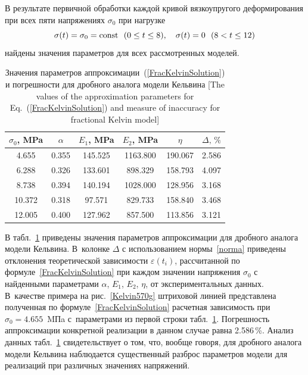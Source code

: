 В результате первичной обработки каждой кривой вязкоупругого деформирования при всех пяти напряжениях $\sigma_{0}$
при нагрузке
 $$\sigma(t)=\sigma_{0}={\rm const}~~ (0\leq t \leq 8),\quad \sigma(t)=0~~ (8<t\leq 12)$$ 
 найдены значения параметров для всех рассмотренных моделей.
 
\begin{table}[b!]

\small \centering

\caption{Значения параметров аппроксимации~(\ref{FracKelvinSolution}) и погрешности для дробного аналога модели Кельвина [The values of the approximation parameters for Eq.~(\ref{FracKelvinSolution}) and measure of inaccuracy for fractional Kelvin model] \label{un:tabl1}}
\vspace{-3mm}
\renewcommand{\tabcolsep}{0.55cm}
\begin{tabular}{c||c|c|c|c|c}
\hline
\rule{0mm}{11pt}%
\footnotesize $\sigma_{0}$, MPa & \footnotesize  $\alpha$ & \footnotesize  $E_{1}$, MPa & \footnotesize  $E_{2}$, MPa & \footnotesize  $\eta$ & \footnotesize  $\Delta,\, \%$ \\
            \hline
            \rule{0mm}{12pt}%
            \phantom{1}4.655 & 0.355 & 145.525 & 1163.800 & 190.067 & 2.586 \\
             \phantom{1}6.288 & 0.326 & 133.601 & \phantom{1}898.329 & 158.793 & 4.097 \\
             \phantom{1}8.738 & 0.394 & 140.194 & 1028.000 & 128.956 & 3.168 \\
             10.372 & 0.318 & \phantom{1}97.571 & \phantom{1}829.733 & 158.840 & 3.468 \\
             12.005 & 0.400 & 127.962 & \phantom{1}857.500 & 113.856 & 3.121 \\
            \hline
        \end{tabular}

\end{table} 
 

В табл.~\ref{un:tabl1} приведены значения параметров аппроксимации для дробного аналога модели Кельвина. 
В~колонке $\Delta$ с использованием нормы~\eqref{norma}  приведены отклонения теоретической зависимости $\varepsilon(t_{i})$,  рассчитанной по формуле~\eqref{FracKelvinSolution} при каждом значении напряжения $\sigma_{0}$ с найденными параметрами $\alpha$, $E_{1}$, $E_{2}$, $\eta$, от экспериментальных данных. 
В~качестве примера на рис.~\ref{Kelvin570g} штриховой линией представлена полученная по формуле~\eqref{FracKelvinSolution} расчетная зависимость при $\sigma_{0}=4.655$~MПa с~параметрами из первой строки табл.~\ref{un:tabl1}. 
Погрешность аппроксимации конкретной реализации в данном случае равна 2.586\,\%. 
Анализ данных табл.~\ref{un:tabl1} свидетельствует о том, что, вообще говоря, для дробного аналога модели Кельвина наблюдается существенный разброс параметров модели для реализаций при различных значениях напряжений.

